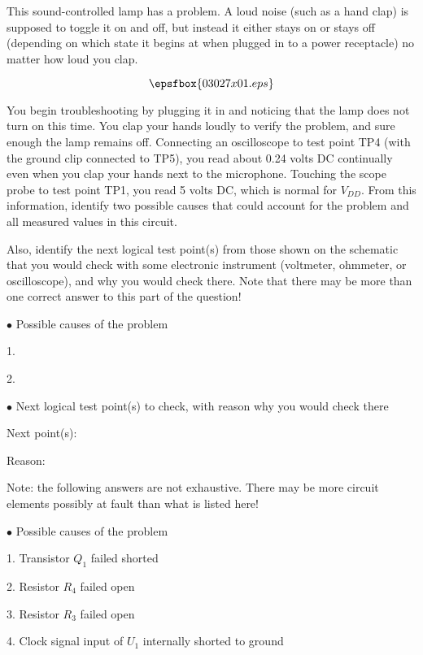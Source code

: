 

This sound-controlled lamp has a problem.  A loud noise (such as a hand clap) is supposed to toggle it on and off, but instead it either stays on or stays off (depending on which state it begins at when plugged in to a power receptacle) no matter how loud you clap.

$$\epsfbox{03027x01.eps}$$

You begin troubleshooting by plugging it in and noticing that the lamp does not turn on this time.  You clap your hands loudly to verify the problem, and sure enough the lamp remains off.  Connecting an oscilloscope to test point TP4 (with the ground clip connected to TP5), you read about 0.24 volts DC continually even when you clap your hands next to the microphone.  Touching the scope probe to test point TP1, you read 5 volts DC, which is normal for $V_{DD}$.  From this information, identify two possible causes that could account for the problem and all measured values in this circuit.

Also, identify the next logical test point(s) from those shown on the schematic that you would check with some electronic instrument (voltmeter, ohmmeter, or oscilloscope), and why you would check there.  Note that there may be more than one correct answer to this part of the question!

\medskip
\goodbreak
\item{$\bullet$} Possible causes of the problem
\item{1.}
\item{2.} 
\medskip

\medskip
\item{$\bullet$} Next logical test point(s) to check, with reason why you would check there
\item{Next point(s):}
\item{Reason:}
\medskip







Note: the following answers are not exhaustive.  There may be more circuit elements possibly at fault than what is listed here!

\medskip
\goodbreak
\item{$\bullet$} Possible causes of the problem
\item{1.} Transistor $Q_1$ failed shorted
\item{2.} Resistor $R_4$ failed open
\item{3.} Resistor $R_3$ failed open
\item{4.} Clock signal input of $U_1$ internally shorted to ground
\medskip

